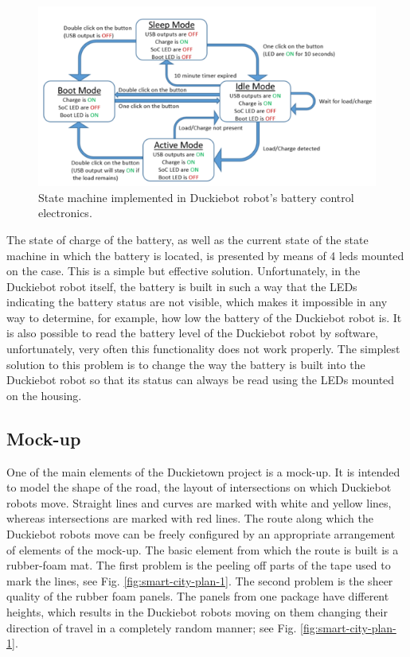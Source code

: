 \documentclass[conference]{IEEEtran}
\begin{document}
\begin{figure}[ht!]
    \centering
    \includegraphics[width=1.0\columnwidth]{BatteryStateMachine.png}
    \caption{State machine implemented in Duckiebot robot's battery control electronics.}
    \label{fig:battery-state-machine}
\end{figure}

The state of charge of the battery, as well as the current state of the state machine in which the battery is located, is presented by means of 4 leds mounted on the case. This is a simple but effective solution. Unfortunately, in the Duckiebot robot itself, the battery is built in such a way that the LEDs indicating the battery status are not visible, which makes it impossible in any way to determine, for example, how low the battery of the Duckiebot robot is. It is also possible to read the battery level of the Duckiebot robot by software, unfortunately, very often this functionality does not work properly. The simplest solution to this problem is to change the way the battery is built into the Duckiebot robot so that its status can always be read using the LEDs mounted on the housing. 

\subsection{Mock-up}\label{subsec:plane}
One of the main elements of the Duckietown project is a mock-up. It is intended to model the shape of the road, the layout of intersections on which Duckiebot robots move. Straight lines and curves are marked with white and yellow lines, whereas intersections are marked with red lines. The route along which the Duckiebot robots move can be freely configured by an appropriate arrangement of elements of the mock-up. The basic element from which the route is built is a rubber-foam mat. The first problem is the peeling off parts of the tape used to mark the lines, see Fig. \ref{fig:smart-city-plan-1}. The second problem is the sheer quality of the rubber foam panels. The panels from one package have different heights, which results in the Duckiebot robots moving on them changing their direction of travel in a completely random manner; see Fig. \ref{fig:smart-city-plan-1}.
\end{document}

